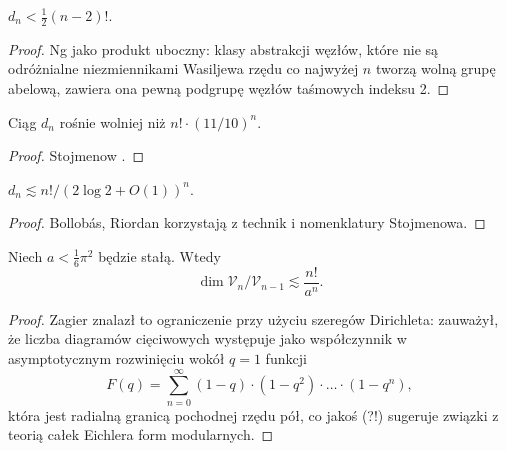 \begin{proposition}
    $d_n < \frac 12 (n-2)!$.
\end{proposition}

\begin{proof}
%
    Ng \cite{ng98} jako produkt uboczny: klasy abstrakcji węzłów, które nie są odróżnialne niezmiennikami Wasiljewa rzędu co najwyżej $n$ tworzą wolną grupę abelową, zawiera ona pewną podgrupę węzłów taśmowych indeksu 2.
\end{proof}

\begin{proposition}
    Ciąg $d_n$ rośnie wolniej niż $n! \cdot (11/10)^n$.
\end{proposition}

\begin{proof}
%
    Stojmenow \cite{stoimenow98}.
\end{proof}

\begin{proposition}
    $d_n \lesssim n! / (2 \log 2 + O(1))^n$.
\end{proposition}

\begin{proof}
%
%
    Bollobás, Riordan \cite{bollobas00} korzystają z technik i nomenklatury Stojmenowa.
\end{proof}

\begin{proposition}
    Niech $a < \frac 1 6 \pi^2$ będzie stałą.
    Wtedy
    \begin{equation}
        \dim \mathcal V_n / \mathcal V_{n-1} \lesssim \frac{n!}{a^n}.
    \end{equation}
\end{proposition}

\begin{proof}
%
%
    Zagier \cite{zagier01} znalazł to ograniczenie przy użyciu szeregów Dirichleta: zauważył, że liczba diagramów cięciwowych występuje jako współczynnik w asymptotycznym rozwinięciu wokół $q = 1$ funkcji
    \begin{equation}
        F(q) = \sum_{n=0}^\infty (1-q) \cdot (1-q^2) \cdot \ldots \cdot (1-q^n),
    \end{equation}
    która jest radialną granicą pochodnej rzędu pół, co jakoś (?!) sugeruje związki z teorią całek Eichlera form modularnych.
\end{proof}

